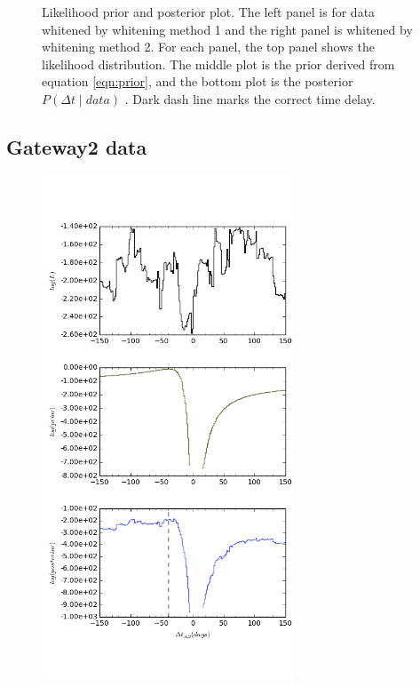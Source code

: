 \documentclass[\docopts]{\docclass}
\begin{document}
\begin{figure}[!h]
\begin{minipage}[bottom]{0.4\textwidth}
  \end{minipage}
 \caption{Likelihood prior and posterior plot. The left panel is for data whitened by whitening method 1 and the right panel is whitened by whitening method 2. For each panel, the top panel shows the likelihood distribution. The middle plot is the prior derived from equation \ref{eqn:prior}, and the bottom plot is the posterior $P(\Delta t \mid data)$ . Dark dash line marks the correct time delay. }
\end{figure}
\newpage
\subsection{Gateway2 data}

\begin{figure}[!h]
  \centering
  \begin{minipage}[bottom]{0.4\textwidth}
\includegraphics[width=\textwidth, height=15cm, keepaspectratio]{whiten1/data2_full_log.png}
  \end{minipage}
  \hfill
  \begin{minipage}[bottom]{0.4\textwidth}

\end{minipage}
\end{figure}
\end{document}
